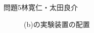 \documentclass[fleqn]{jbook}
\begin{document}
\begin{answer}{問題5}{林寛仁・太田良介}
\begin{enumerate}
\begin{figure}[h]
		\begin{center}
		\caption{(b)の実験装置の配置}
  		\end{center}
\end{figure}


\end{enumerate}
\end{answer}
\end{document}
